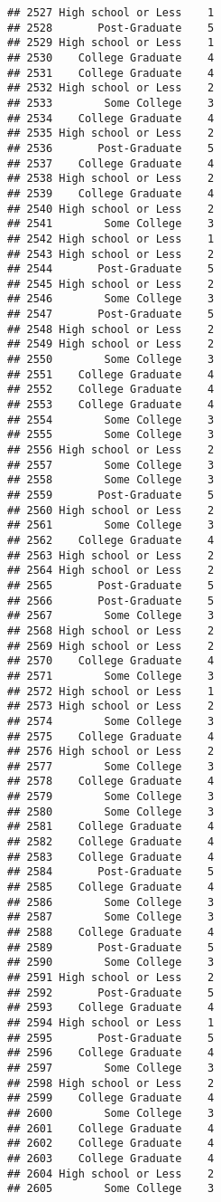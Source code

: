 \documentclass[
]{article}
\begin{document}
\begin{verbatim}
## 2527 High school or Less    1
## 2528       Post-Graduate    5
## 2529 High school or Less    1
## 2530    College Graduate    4
## 2531    College Graduate    4
## 2532 High school or Less    2
## 2533        Some College    3
## 2534    College Graduate    4
## 2535 High school or Less    2
## 2536       Post-Graduate    5
## 2537    College Graduate    4
## 2538 High school or Less    2
## 2539    College Graduate    4
## 2540 High school or Less    2
## 2541        Some College    3
## 2542 High school or Less    1
## 2543 High school or Less    2
## 2544       Post-Graduate    5
## 2545 High school or Less    2
## 2546        Some College    3
## 2547       Post-Graduate    5
## 2548 High school or Less    2
## 2549 High school or Less    2
## 2550        Some College    3
## 2551    College Graduate    4
## 2552    College Graduate    4
## 2553    College Graduate    4
## 2554        Some College    3
## 2555        Some College    3
## 2556 High school or Less    2
## 2557        Some College    3
## 2558        Some College    3
## 2559       Post-Graduate    5
## 2560 High school or Less    2
## 2561        Some College    3
## 2562    College Graduate    4
## 2563 High school or Less    2
## 2564 High school or Less    2
## 2565       Post-Graduate    5
## 2566       Post-Graduate    5
## 2567        Some College    3
## 2568 High school or Less    2
## 2569 High school or Less    2
## 2570    College Graduate    4
## 2571        Some College    3
## 2572 High school or Less    1
## 2573 High school or Less    2
## 2574        Some College    3
## 2575    College Graduate    4
## 2576 High school or Less    2
## 2577        Some College    3
## 2578    College Graduate    4
## 2579        Some College    3
## 2580        Some College    3
## 2581    College Graduate    4
## 2582    College Graduate    4
## 2583    College Graduate    4
## 2584       Post-Graduate    5
## 2585    College Graduate    4
## 2586        Some College    3
## 2587        Some College    3
## 2588    College Graduate    4
## 2589       Post-Graduate    5
## 2590        Some College    3
## 2591 High school or Less    2
## 2592       Post-Graduate    5
## 2593    College Graduate    4
## 2594 High school or Less    1
## 2595       Post-Graduate    5
## 2596    College Graduate    4
## 2597        Some College    3
## 2598 High school or Less    2
## 2599    College Graduate    4
## 2600        Some College    3
## 2601    College Graduate    4
## 2602    College Graduate    4
## 2603    College Graduate    4
## 2604 High school or Less    2
## 2605        Some College    3

\end{verbatim}
\end{document}
